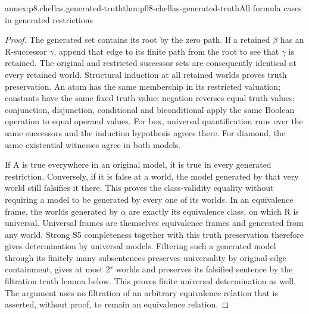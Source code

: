 \begin{annexitem}{annex:p8.chellas.generated-truth}{thm:p08-chellas-generated-truth}{All formula cases in generated restrictions}
\begin{proof}
The generated set contains its root by the zero path. If a retained
\(\beta\) has an R-successor \(\gamma\), append that edge to
its finite path from the root to see that \(\gamma\) is retained.
The original and restricted successor sets are consequently identical
at every retained world. Structural induction at all retained worlds
proves truth preservation. An atom has the same membership in its
restricted valuation; constants have the same fixed truth value;
negation reverses equal truth values; conjunction, disjunction,
conditional and biconditional apply the same Boolean operation to
equal operand values. For box, universal quantification runs over
the same successors and the induction hypothesis agrees there.
For diamond, the same existential witnesses agree in both models.

If A is true everywhere in an original model, it is true in every
generated restriction. Conversely, if it is false at a world,
the model generated by that very world still falsifies it there.
This proves the class-validity equality without requiring a model to
be generated by every one of its worlds.
In an equivalence frame, the worlds generated by \(\alpha\) are
exactly its equivalence class, on which R is universal. Universal
frames are themselves equivalence frames and generated from any
world. Strong S5 completeness together with this truth preservation
therefore gives determination by universal models. Filtering such
a generated model through its finitely many subsentences preserves
universality by original-edge containment, gives at most \(2^s\)
worlds and preserves its falsified sentence by the filtration truth
lemma below. This proves finite universal determination as well.
The argument uses no filtration of an arbitrary equivalence relation
that is asserted, without proof, to remain an equivalence relation.
\end{proof}
\end{annexitem}

